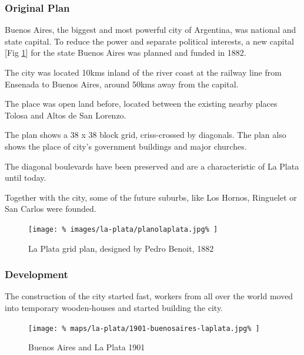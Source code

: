 \documentclass{article}
\begin{document}
		\begin{multicols}{2}
      		\raggedcolumns
			
			\subsubsection{Original Plan}
			Buenos Aires, the biggest and most powerful city of Argentina, was national and state capital. To reduce the power and separate political interests, a new capital [Fig \ref{fig:img:plan-la-plata-1882}] for the state Buenos Aires was planned and funded in 1882.
			
			The city was located 10kms inland of the river coast at the railway line from Ensenada to Buenos Aires, around 50kms away from the capital.
			
			The place was open land before, located between the existing nearby places Tolosa and Altos de San Lorenzo.
			
			
			The plan shows a 38 x 38 block grid, criss-crossed by diagonals. The plan also shows the place of city’s government buildings and major churches.
			
			The diagonal boulevards have been preserved and are a characteristic of La Plata until today.
			
			Together with the city, some of the future suburbs, like Los Hornos, Ringuelet or San Carlos were founded.
			
			
			\begin{figure}[H]
				\texttt{[image: \%
					images/la-plata/planolaplata.jpg\%
				]}
				\caption{La Plata grid plan, designed by Pedro Benoit, 1882  \cite{RecoletaCemetery:PedroBenoit}}
				\label{fig:img:plan-la-plata-1882}
			\end{figure}
			
			
			
			\newpage
			\subsubsection{Development}
			
			The construction of the city started fast, workers from all over the world moved into temporary wooden-houses and started building the city.			
			
			\begin{figure}[H]
				\texttt{[image: \%
					maps/la-plata/1901-buenosaires-laplata.jpg\%
				]}
				\caption{Buenos Aires and La Plata 1901  \cite{RiviereDeLaPlata}}
				\label{fig:map:buenosaires-la-plata-1901}
			\end{figure}
			

\end{multicols}
\end{document}
